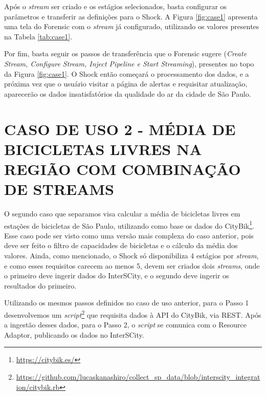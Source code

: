 Após o \textit{stream} ser criado e os estágios selecionados, basta
configurar os parâmetros e transferir as definições para o Shock. A Figura
\ref{fig:case1} apresenta uma tela do Forensic com o \textit{stream} já
configurado, utilizando os valores presentes na Tabela \ref{tab:case1}.

Por fim, basta seguir os passos de transferência que o Forensic sugere (\textit{Create
Stream, Configure Stream, Inject Pipeline e Start Streaming}), presentes no
topo da Figura \ref{fig:case1}. O Shock então começará o processamento dos
dados, e a próxima vez que o usuário visitar a página de alertas e requisitar
atualização, aparecerão os dados insatisfatórios da qualidade do ar da cidade
de São Paulo.

\section{CASO DE USO 2 - MÉDIA DE BICICLETAS LIVRES NA REGIÃO COM COMBINAÇÃO DE STREAMS}

O segundo caso que separamos visa calcular a média de bicicletas livres em estações
de bicicletas de São Paulo, utilizando como base os dados do
CityBik\footnote{\url{https://citybik.es/}}. Esse caso pode ser visto como uma
versão mais complexa do caso anterior, pois deve ser feito o filtro de
capacidades de bicicletas e o cálculo da média dos valores. Ainda,
como mencionado, o Shock só disponibiliza 4 estágios por
\textit{stream}, e como esses requisitos carecem ao menos 5, devem ser criados
dois \textit{streams}, onde o primeiro deve ingerir dados do InterSCity, e o
segundo deve ingerir os resultados do primeiro.

Utilizando os mesmos passos definidos no caso de uso anterior, para o Passo 1
desenvolvemos um
\textit{script}\footnote{\url{https://github.com/lucaskanashiro/collect_sp_data/blob/interscity_integration/citybik.rb}}
que requisita dados à API do CityBik, via REST. Após a ingestão desses dados,
para o Passo 2, o \textit{script} se comunica com o Resource Adaptor,
publicando os dados no InterSCity.

